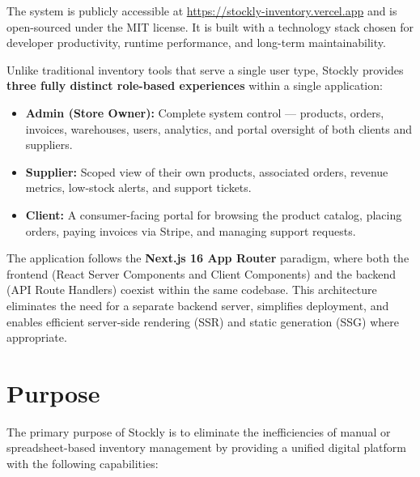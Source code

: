 \documentclass[12pt,a4paper]{report}
\begin{document}
The system is publicly accessible at \url{https://stockly-inventory.vercel.app} and is open-sourced under the MIT license. It is built with a technology stack chosen for developer productivity, runtime performance, and long-term maintainability.

\begin{tcolorbox}[infobox,title={Three-Role Architecture}]
Unlike traditional inventory tools that serve a single user type, Stockly provides \textbf{three fully distinct role-based experiences} within a single application:
\begin{itemize}[leftmargin=1.5em]
  \item \textbf{Admin (Store Owner):} Complete system control --- products, orders, invoices, warehouses, users, analytics, and portal oversight of both clients and suppliers.
  \item \textbf{Supplier:} Scoped view of their own products, associated orders, revenue metrics, low-stock alerts, and support tickets.
  \item \textbf{Client:} A consumer-facing portal for browsing the product catalog, placing orders, paying invoices via Stripe, and managing support requests.
\end{itemize}
\end{tcolorbox}

The application follows the \textbf{Next.js 16 App Router} paradigm, where both the frontend (React Server Components and Client Components) and the backend (API Route Handlers) coexist within the same codebase. This architecture eliminates the need for a separate backend server, simplifies deployment, and enables efficient server-side rendering (SSR) and static generation (SSG) where appropriate.

\section{Purpose}

The primary purpose of Stockly is to eliminate the inefficiencies of manual or spreadsheet-based inventory management by providing a unified digital platform with the following capabilities:
\end{document}
